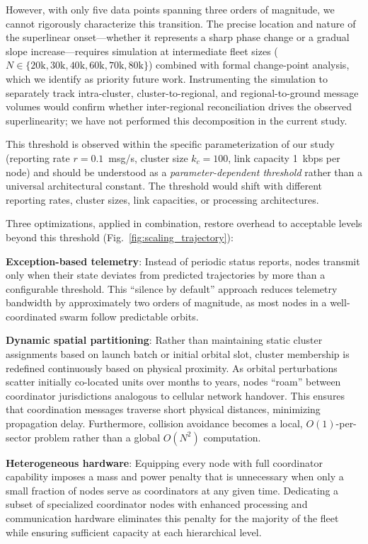 \documentclass[journal]{IEEEtran}
\begin{document}
However, with only five data points spanning three orders of magnitude, we cannot rigorously characterize this transition. The precise location and nature of the superlinear onset---whether it represents a sharp phase change or a gradual slope increase---requires simulation at intermediate fleet sizes ($N \in \{20\text{k}, 30\text{k}, 40\text{k}, 60\text{k}, 70\text{k}, 80\text{k}\}$) combined with formal change-point analysis, which we identify as priority future work. Instrumenting the simulation to separately track intra-cluster, cluster-to-regional, and regional-to-ground message volumes would confirm whether inter-regional reconciliation drives the observed superlinearity; we have not performed this decomposition in the current study.

This threshold is observed within the specific parameterization of our study (reporting rate $r = 0.1$~msg/s, cluster size $k_c = 100$, link capacity 1~kbps per node) and should be understood as a \emph{parameter-dependent threshold} rather than a universal architectural constant. The threshold would shift with different reporting rates, cluster sizes, link capacities, or processing architectures.

Three optimizations, applied in combination, restore overhead to acceptable levels beyond this threshold (Fig.~\ref{fig:scaling_trajectory}):

\textbf{Exception-based telemetry}: Instead of periodic status reports, nodes transmit only when their state deviates from predicted trajectories by more than a configurable threshold. This ``silence by default'' approach reduces telemetry bandwidth by approximately two orders of magnitude, as most nodes in a well-coordinated swarm follow predictable orbits.

\textbf{Dynamic spatial partitioning}: Rather than maintaining static cluster assignments based on launch batch or initial orbital slot, cluster membership is redefined continuously based on physical proximity. As orbital perturbations scatter initially co-located units over months to years, nodes ``roam'' between coordinator jurisdictions analogous to cellular network handover. This ensures that coordination messages traverse short physical distances, minimizing propagation delay. Furthermore, collision avoidance becomes a local, $O(1)$-per-sector problem rather than a global $O(N^2)$ computation.

\textbf{Heterogeneous hardware}: Equipping every node with full coordinator capability imposes a mass and power penalty that is unnecessary when only a small fraction of nodes serve as coordinators at any given time. Dedicating a subset of specialized coordinator nodes with enhanced processing and communication hardware eliminates this penalty for the majority of the fleet while ensuring sufficient capacity at each hierarchical level.
\end{document}
